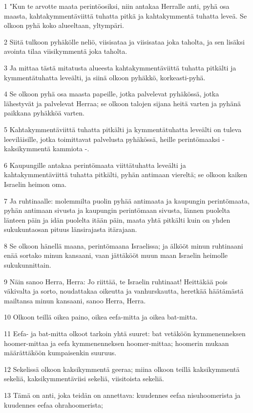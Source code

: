 \par 1 "Kun te arvotte maata perintöosiksi, niin antakaa Herralle anti, pyhä osa maasta, kahtakymmentäviittä tuhatta pitkä ja kahtakymmentä tuhatta leveä. Se olkoon pyhä koko alueeltaan, yltympäri.
\par 2 Siitä tulkoon pyhäkölle neliö, viisisataa ja viisisataa joka taholta, ja sen lisäksi avointa tilaa viisikymmentä joka taholta.
\par 3 Ja mittaa tästä mitatusta alueesta kahtakymmentäviittä tuhatta pitkälti ja kymmentätuhatta leveälti, ja siinä olkoon pyhäkkö, korkeasti-pyhä.
\par 4 Se olkoon pyhä osa maasta papeille, jotka palvelevat pyhäkössä, jotka lähestyvät ja palvelevat Herraa; se olkoon talojen sijana heitä varten ja pyhänä paikkana pyhäkköä varten.
\par 5 Kahtakymmentäviittä tuhatta pitkälti ja kymmentätuhatta leveälti on tuleva leeviläisille, jotka toimittavat palvelusta pyhäkössä, heille perintömaaksi - kaksikymmentä kammiota -.
\par 6 Kaupungille antakaa perintömaata viittätuhatta leveälti ja kahtakymmentäviittä tuhatta pitkälti, pyhän antimaan viereltä; se olkoon kaiken Israelin heimon oma.
\par 7 Ja ruhtinaalle: molemmilta puolin pyhää antimaata ja kaupungin perintömaata, pyhän antimaan sivusta ja kaupungin perintömaan sivusta, lännen puolelta länteen päin ja idän puolelta itään päin, maata yhtä pitkälti kuin on yhden sukukuntaosan pituus länsirajasta itärajaan.
\par 8 Se olkoon hänellä maana, perintömaana Israelissa; ja älkööt minun ruhtinaani enää sortako minun kansaani, vaan jättäkööt muun maan Israelin heimolle sukukunnittain.
\par 9 Näin sanoo Herra, Herra: Jo riittää, te Israelin ruhtinaat! Heittäkää pois väkivalta ja sorto, noudattakaa oikeutta ja vanhurskautta, heretkää häätämästä mailtansa minun kansaani, sanoo Herra, Herra.
\par 10 Olkoon teillä oikea paino, oikea eefa-mitta ja oikea bat-mitta.
\par 11 Eefa- ja bat-mitta olkoot tarkoin yhtä suuret: bat vetäköön kymmenenneksen hoomer-mittaa ja eefa kymmenenneksen hoomer-mittaa; hoomerin mukaan määrättäköön kumpaisenkin suuruus.
\par 12 Sekelissä olkoon kaksikymmentä geeraa; miina olkoon teillä kaksikymmentä sekeliä, kaksikymmentäviisi sekeliä, viisitoista sekeliä.
\par 13 Tämä on anti, joka teidän on annettava: kuudennes eefaa nisuhoomerista ja kuudennes eefaa ohrahoomerista;
